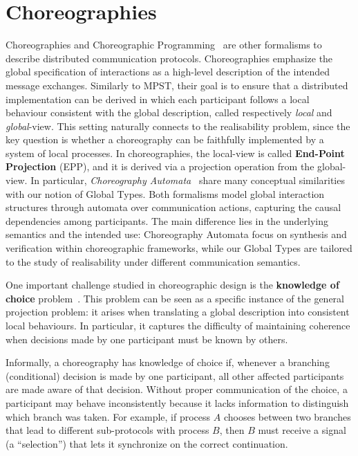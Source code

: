 \section{Choreographies}
Choreographies \cite{ws-cdl-2005} and Choreographic 
Programming~\cite{montesi2014choreographic, giallorenzo2024choral, cruz2022functional} 
are other formalisms to describe  
distributed communication protocols. Choreographies emphasize the 
global specification of interactions as a high-level description of the 
intended message exchanges. Similarly to MPST, their goal is to ensure that
a distributed implementation can be derived in which each participant 
follows a local behaviour consistent with the global description, called
respectively \emph{local} and \emph{global}-view. This setting naturally 
connects to the realisability problem, since the key question is whether 
a choreography can be faithfully implemented by a system of local 
processes. 
In choreographies, the local-view is called 
\textbf{End-Point Projection} (EPP),
and it is derived via a projection operation from the global-view.
In particular, \emph{Choreography Automata}~\cite{barbanera2020choreography}  
share many conceptual similarities with our notion of Global Types.  
Both formalisms model global interaction structures through automata  
over communication actions, capturing the causal dependencies among  
participants. The main difference lies in the underlying semantics and  
the intended use: Choreography Automata focus on synthesis and  
verification within choreographic frameworks, while our Global Types  
are tailored to the study of realisability under different
communication semantics.  

One important challenge studied in choreographic design is the 
\textbf{knowledge of choice} problem~\cite{lanese2008bridging, castagna2012global}. 
This problem can be seen as a 
specific instance of the general projection problem: it arises when 
translating a global description into consistent local behaviours. 
In particular, it captures the difficulty of maintaining coherence 
when decisions made by one participant must be known by others.  

Informally, a choreography has knowledge of choice if, whenever a 
branching (conditional) decision is made by one participant, all 
other affected participants are made aware of that decision. Without 
proper communication of the choice, a participant may behave 
inconsistently because it lacks information to distinguish which 
branch was taken. For example, if process \(A\) chooses between two 
branches that lead to different sub-protocols with process \(B\), 
then \(B\) must receive a signal (a ``selection'') that lets it 
synchronize on the correct continuation.  

